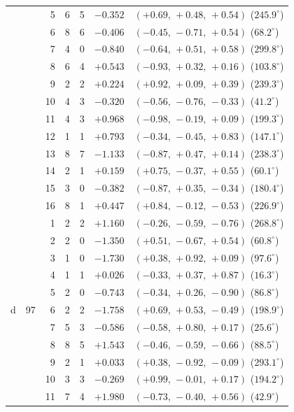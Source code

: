 \begin{table}
\begin{tabular}{@{}llrrrrl@{}}
 &  & 5 & 6 & 5 & $-0.352$ & $(+0.69,\,+0.48,\,+0.54)$ ($245.9^\circ$) \\
 &  & 6 & 8 & 6 & $-0.406$ & $(-0.45,\,-0.71,\,+0.54)$ ($68.2^\circ$) \\
 &  & 7 & 4 & 0 & $-0.840$ & $(-0.64,\,+0.51,\,+0.58)$ ($299.8^\circ$) \\
 &  & 8 & 6 & 4 & $+0.543$ & $(-0.93,\,+0.32,\,+0.16)$ ($103.8^\circ$) \\
 &  & 9 & 2 & 2 & $+0.224$ & $(+0.92,\,+0.09,\,+0.39)$ ($239.3^\circ$) \\
 &  & 10 & 4 & 3 & $-0.320$ & $(-0.56,\,-0.76,\,-0.33)$ ($41.2^\circ$) \\
 &  & 11 & 4 & 3 & $+0.968$ & $(-0.98,\,-0.19,\,+0.09)$ ($199.3^\circ$) \\
 &  & 12 & 1 & 1 & $+0.793$ & $(-0.34,\,-0.45,\,+0.83)$ ($147.1^\circ$) \\
 &  & 13 & 8 & 7 & $-1.133$ & $(-0.87,\,+0.47,\,+0.14)$ ($238.3^\circ$) \\
 &  & 14 & 2 & 1 & $+0.159$ & $(+0.75,\,-0.37,\,+0.55)$ ($60.1^\circ$) \\
 &  & 15 & 3 & 0 & $-0.382$ & $(-0.87,\,+0.35,\,-0.34)$ ($180.4^\circ$) \\
 &  & 16 & 8 & 1 & $+0.447$ & $(+0.84,\,-0.12,\,-0.53)$ ($226.9^\circ$) \\
\midrule
\multirow{24}{*}{d} & \multirow{24}{*}{97} & 1 & 2 & 2 & $+1.160$ & $(-0.26,\,-0.59,\,-0.76)$ ($268.8^\circ$) \\
 &  & 2 & 2 & 0 & $-1.350$ & $(+0.51,\,-0.67,\,+0.54)$ ($60.8^\circ$) \\
 &  & 3 & 1 & 0 & $-1.730$ & $(+0.38,\,+0.92,\,+0.09)$ ($97.6^\circ$) \\
 &  & 4 & 1 & 1 & $+0.026$ & $(-0.33,\,+0.37,\,+0.87)$ ($16.3^\circ$) \\
 &  & 5 & 2 & 0 & $-0.743$ & $(-0.34,\,+0.26,\,-0.90)$ ($86.8^\circ$) \\
 &  & 6 & 2 & 2 & $-1.758$ & $(+0.69,\,+0.53,\,-0.49)$ ($198.9^\circ$) \\
 &  & 7 & 5 & 3 & $-0.586$ & $(-0.58,\,+0.80,\,+0.17)$ ($25.6^\circ$) \\
 &  & 8 & 8 & 5 & $+1.543$ & $(-0.46,\,-0.59,\,-0.66)$ ($88.5^\circ$) \\
 &  & 9 & 2 & 1 & $+0.033$ & $(+0.38,\,-0.92,\,-0.09)$ ($293.1^\circ$) \\
 &  & 10 & 3 & 3 & $-0.269$ & $(+0.99,\,-0.01,\,+0.17)$ ($194.2^\circ$) \\
 &  & 11 & 7 & 4 & $+1.980$ & $(-0.73,\,-0.40,\,+0.56)$ ($42.9^\circ$) \\

\end{tabular}
\end{table}
